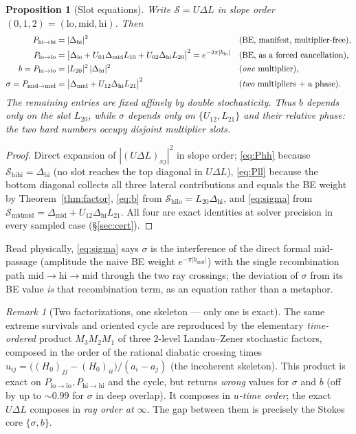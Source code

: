 \documentclass[11pt]{article}
\newtheorem{proposition}{Proposition}
\theoremstyle{definition}
\theoremstyle{remark}
\newtheorem{remark}{Remark}
\newcommand{\Scat}{\mathcal{S}}
\newcommand{\lo}{\mathrm{lo}}
\newcommand{\mi}{\mathrm{mid}}
\newcommand{\hi}{\mathrm{hi}}
\begin{document}
\begin{proposition}[Slot equations]\label{prop:slots}
Write $\Scat=U\Delta L$ in slope order $(0,1,2)=(\lo,\mi,\hi)$. Then
\begin{align}
P_{\hi\to\hi}&=|\Delta_\hi|^2 &&\text{(BE, manifest, multiplier-free)},\label{eq:Phh}\\
P_{\lo\to\lo}&=\big|\Delta_\lo+U_{01}\Delta_\mi L_{10}+U_{02}\Delta_\hi L_{20}\big|^2=e^{-2\pi|b_\lo|}
&&\text{(BE, as a forced cancellation)},\label{eq:Pll}\\
b=P_{\hi\to\lo}&=|L_{20}|^2\,|\Delta_\hi|^2 &&\text{(\emph{one} multiplier)},\label{eq:b}\\
\sigma=P_{\mi\to\mi}&=\big|\Delta_\mi+U_{12}\Delta_\hi L_{21}\big|^2 &&\text{(\emph{two} multipliers + a phase).}\label{eq:sigma}
\end{align}
The remaining entries are fixed affinely by double stochasticity. Thus $b$ depends only on the
slot $L_{20}$, while $\sigma$ depends only on $\{U_{12},L_{21}\}$ and their relative phase:
the two hard numbers occupy \emph{disjoint} multiplier slots.
\end{proposition}

\begin{proof}
Direct expansion of $|(U\Delta L)_{xj}|^2$ in slope order; \eqref{eq:Phh} because $\Scat_{\hi\hi}=\Delta_\hi$
(no slot reaches the top diagonal in $U\Delta L$), \eqref{eq:Pll} because the bottom diagonal
collects all three lateral contributions and equals the BE weight by Theorem~\ref{thm:factor},
\eqref{eq:b} from $\Scat_{\hi\lo}=L_{20}\Delta_\hi$, and \eqref{eq:sigma} from
$\Scat_{\mi\mi}=\Delta_\mi+U_{12}\Delta_\hi L_{21}$. All four are exact identities at solver
precision in every sampled case (\S\ref{sec:cert}).
\end{proof}

Read physically, \eqref{eq:sigma} says $\sigma$ is the interference of the direct formal
mid-passage (amplitude the naive BE weight $e^{-\pi|b_\mi|}$) with the single recombination
path $\mi\!\to\!\hi\!\to\!\mi$ through the two ray crossings; the deviation of $\sigma$ from
its BE value \emph{is} that recombination term, as an equation rather than a metaphor.

\begin{remark}[Two factorizations, one skeleton --- only one is exact]\label{rem:contrast}
The same extreme survivals and oriented cycle are reproduced by the elementary
\emph{time-ordered} product $M_3M_2M_1$ of three $2$-level Landau--Zener stochastic factors,
composed in the order of the rational diabatic crossing times
$u_{ij}=\big((H_0)_{jj}-(H_0)_{ii}\big)/(a_i-a_j)$ (the incoherent skeleton). This product
is exact on $P_{\lo\to\lo},P_{\hi\to\hi}$ and the cycle, but returns \emph{wrong} values for
$\sigma$ and $b$ (off by up to $\sim0.99$ for $\sigma$ in deep overlap). It composes in
\emph{$u$-time order}; the exact $U\Delta L$ composes in \emph{ray order at $\infty$}. The
gap between them is precisely the Stokes core $\{\sigma,b\}$.
\end{remark}
\end{document}
